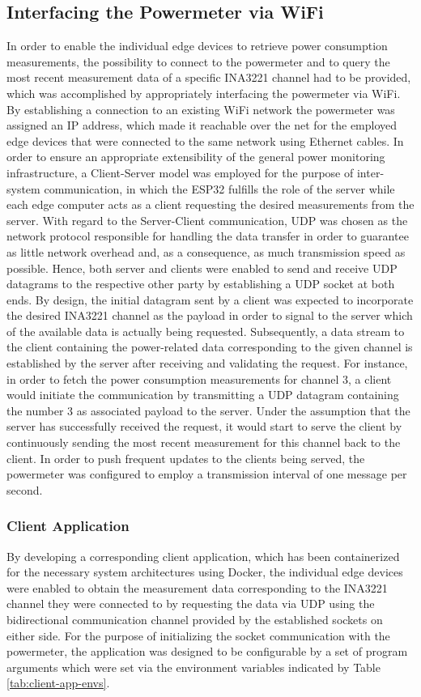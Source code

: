 \subsection{Interfacing the Powermeter via WiFi}

In order to enable the individual edge devices to retrieve power consumption measurements, the possibility to connect to the powermeter and to query the most recent measurement data of a specific INA3221 channel had to be provided, which was accomplished by appropriately interfacing the powermeter via WiFi. By establishing a connection to an existing WiFi network the powermeter was assigned an IP address, which made it reachable over the net for the employed edge devices that were connected to the same network using Ethernet cables. In order to ensure an appropriate extensibility of the general power monitoring infrastructure, a Client-Server model was employed for the purpose of inter-system communication, in which the ESP32 fulfills the role of the server while each edge computer acts as a client requesting the desired measurements from the server. With regard to the Server-Client communication, UDP was chosen as the network protocol responsible for handling the data transfer in order to guarantee as little network overhead and, as a consequence, as much transmission speed as possible. Hence, both server and clients were enabled to send and receive UDP datagrams to the respective other party by establishing a UDP socket at both ends. By design, the initial datagram sent by a client was expected to incorporate the desired INA3221 channel as the payload in order to signal to the server which of the available data is actually being requested. Subsequently, a data stream to the client containing the power-related data corresponding to the given channel is established by the server after receiving and validating the request. For instance, in order to fetch the power consumption measurements for channel 3, a client would initiate the communication by transmitting a UDP datagram containing the number 3 as associated payload to the server. Under the assumption that the server has successfully received the request, it would start to serve the client by continuously sending the most recent measurement for this channel back to the client. In order to push frequent updates to the clients being served, the powermeter was configured to employ a transmission interval of one message per second.


\subsubsection{Client Application}
By developing a corresponding client application, which has been containerized for the necessary system architectures using Docker, the individual edge devices were enabled to obtain the measurement data corresponding to the INA3221 channel they were connected to by requesting the data via UDP using the bidirectional communication channel provided by the established sockets on either side. For the purpose of initializing the socket communication with the powermeter, the application was designed to be configurable by a set of program arguments which were set via the environment variables indicated by Table \ref{tab:client-app-envs}.

